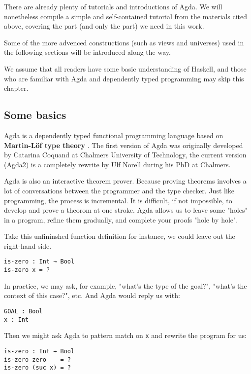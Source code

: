 \documentclass[14pt, a4paper]{article}
\begin{document}
There are already plenty of tutorials and introductions of Agda\cite{norell2009dependently}\cite{FLOLAC16DTP}\cite{brutal}.
We will nonetheless compile a simple and self-contained tutorial from the
materials cited above, covering the part (and only the part) we need in this work.

Some of the more advenced constructions (such as views and universes) used in
the following sections will be introduced along the way.

We assume that all readers have some basic understanding of Haskell, and those
who are familiar with Agda and dependently typed programming may skip this chapter.

\subsection{Some basics}
Agda is a dependently typed functional programming language based on
\textbf{Martin-Löf type theory} \cite{martin1984intuitionistic}.
The first version of Agda was originally developed by Catarina Coquand at Chalmers
University of Technology, the current version (Agda2) is a completely rewrite by
Ulf Norell during his PhD at Chalmers.

Agda is also an interactive theorem prover. Because proving theorems involves a
lot of conversations between the programmer and the type checker. Just like programming,
the process is incremental. It is difficult, if not impossible, to develop and
prove a theorom at one stroke. Agda allows us to leave some "holes" in a
program, refine them gradually, and complete your proofs "hole by hole".

Take this unfininshed function definition for instance, we could leave out the
right-hand side.

\begin{lstlisting}
is-zero : Int → Bool
is-zero x = ?
\end{lstlisting}

In practice, we may ask, for example, "what's the type of the goal?",
 "what's the context of this case?", etc. And Agda would reply us with:

\begin{lstlisting}
GOAL : Bool
x : Int
\end{lstlisting}

Then we might ask Agda to pattern match on {\lstinline|x|} and rewrite the program for us:

\begin{lstlisting}
is-zero : Int → Bool
is-zero zero    = ?
is-zero (suc x) = ?
\end{lstlisting}
\end{document}
